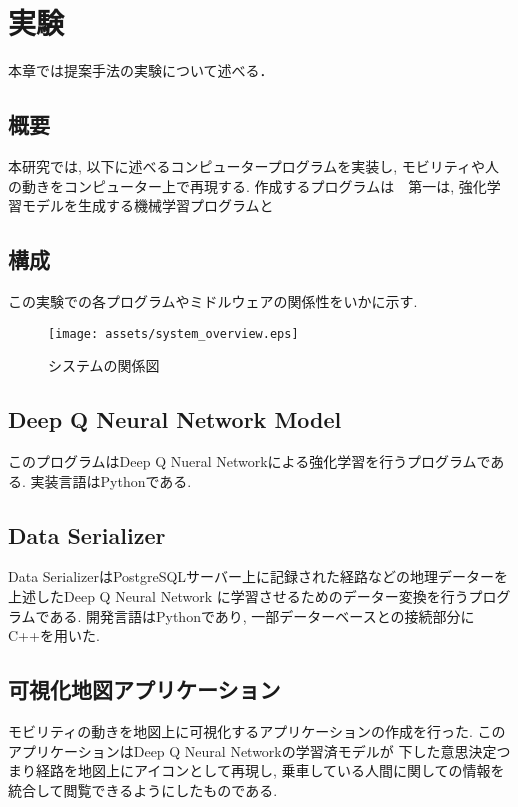\chapter{実験}
\label{implementation}

本章では提案手法の実験について述べる．

\section{概要}

本研究では, 以下に述べるコンピュータープログラムを実装し, モビリティや人の動きをコンピューター上で再現する.
作成するプログラムは　第一は, 強化学習モデルを生成する機械学習プログラムと

\section{構成}

この実験での各プログラムやミドルウェアの関係性をいかに示す.


\begin{figure}[H]
  \centering  %
  \texttt{[image: assets/system\_overview.eps]}
  \caption{システムの関係図}  \label{system_overview}
\end{figure}

\section{Deep Q Neural Network Model}

このプログラムはDeep Q Nueral Networkによる強化学習を行うプログラムである. 実装言語はPythonである.



\section{Data Serializer}

Data SerializerはPostgreSQLサーバー上に記録された経路などの地理データーを上述したDeep Q Neural Network
に学習させるためのデーター変換を行うプログラムである.
開発言語はPythonであり, 一部データーベースとの接続部分にC++を用いた.


\section{可視化地図アプリケーション}

モビリティの動きを地図上に可視化するアプリケーションの作成を行った. このアプリケーションはDeep Q Neural Networkの学習済モデルが
下した意思決定つまり経路を地図上にアイコンとして再現し, 乗車している人間に関しての情報を統合して閲覧できるようにしたものである.


